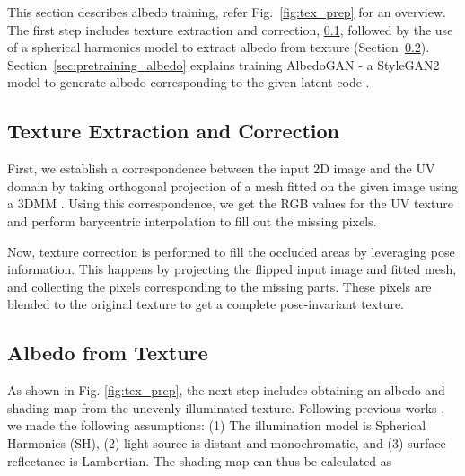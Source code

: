 \documentclass[10pt,twocolumn,letterpaper]{article}
\begin{document}
This section describes albedo training, refer Fig.~\ref{fig:tex_prep} for an overview.  The first step includes texture extraction and correction, \ref{sec:tex_extraction}, followed  by the use of a spherical harmonics model to extract albedo from texture (Section~\ref{sec:sh_model}). Section~\ref{sec:pretraining_albedo} explains training AlbedoGAN - a StyleGAN2 model to generate albedo corresponding to the given latent code . 












\subsection{Texture Extraction and Correction}
\label{sec:tex_extraction}



First, we establish a correspondence between the input 2D image  and the UV domain by taking orthogonal projection of a mesh fitted on the given image using a 3DMM \cite{flame}. Using this correspondence, we get the RGB values for the UV texture and perform barycentric interpolation to fill out the missing pixels. 


Now, texture correction is performed to fill the occluded areas by leveraging pose information. This happens by projecting the flipped input image and fitted mesh, and collecting the pixels corresponding to the missing parts. These pixels are blended to the original texture to get a complete pose-invariant texture.














\subsection{Albedo from Texture}
\label{sec:sh_model}


As shown in Fig. \ref{fig:tex_prep}, the next step includes obtaining an albedo and shading map from the unevenly illuminated texture. Following previous works \cite{deca, deep3dface_recon},  we made the following assumptions: (1) The illumination model is Spherical Harmonics (SH), (2) light source is distant and monochromatic, and (3) surface reflectance is Lambertian. The shading map can thus be calculated as 
\end{document}
